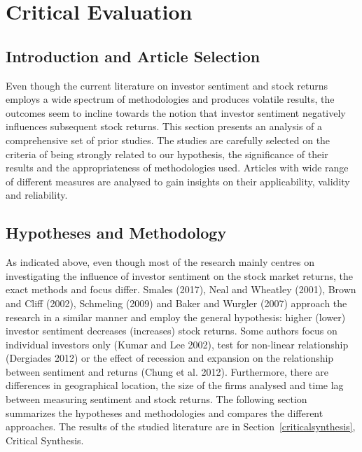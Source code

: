 \section{Critical Evaluation} \label{critical-evaluation}

\subsection{Introduction and Article Selection}
Even though the current literature on investor sentiment and stock returns employs a wide spectrum of methodologies and produces volatile results, the outcomes seem to incline towards the notion that investor sentiment negatively influences subsequent stock returns. This section presents an analysis of a comprehensive set of prior studies. The studies are carefully selected on the criteria of being strongly related to our hypothesis, the significance of their results and the appropriateness of methodologies used. Articles with wide range of different measures are analysed to gain insights on their applicability, validity and reliability.

\subsection{Hypotheses and Methodology}
As indicated above, even though most of the research mainly centres on investigating the influence of investor sentiment on the stock market returns, the exact methods and focus differ. Smales (2017), Neal and Wheatley (2001), Brown and Cliff (2002), Schmeling (2009) and Baker and Wurgler (2007) approach the research in a similar manner and employ the general hypothesis:  higher (lower) investor sentiment decreases (increases) stock returns. Some authors focus on individual investors only (Kumar and Lee 2002), test for non-linear relationship (Dergiades 2012) or the effect of recession and expansion on the relationship between sentiment and returns (Chung et al. 2012). Furthermore, there are differences in geographical location, the size of the firms analysed and time lag between measuring sentiment and stock returns. The following section summarizes the hypotheses and methodologies and compares the different approaches. The results of the studied literature are in Section~\ref{criticalsynthesis}, Critical Synthesis.

